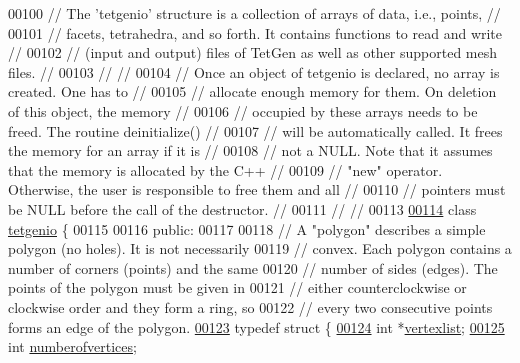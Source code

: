 \begin{DoxyCode}
00100 \textcolor{comment}{// The 'tetgenio' structure is a collection of arrays of data, i.e., points, //}
00101 \textcolor{comment}{// facets, tetrahedra, and so forth. It contains functions to read and write //}
00102 \textcolor{comment}{// (input and output) files of TetGen as well as other supported mesh files. //}
00103 \textcolor{comment}{//                                                                           //}
00104 \textcolor{comment}{// Once an object of tetgenio is declared,  no array is created. One has to  //}
00105 \textcolor{comment}{// allocate enough memory for them. On deletion of this object, the memory   //}
00106 \textcolor{comment}{// occupied by these arrays needs to be freed.  The routine deinitialize()   //}
00107 \textcolor{comment}{// will be automatically called.  It frees the memory for an array if it is  //}
00108 \textcolor{comment}{// not a NULL. Note that it assumes that the memory is allocated by the C++  //}
00109 \textcolor{comment}{// "new" operator.  Otherwise, the user is responsible to free them and all  //}
00110 \textcolor{comment}{// pointers must be NULL before the call of the destructor.                  //}
00111 \textcolor{comment}{//                                                                           //}
00113 \textcolor{comment}{}
\hypertarget{tetgen_8h_source.tex_l00114}{}\hyperlink{classtetgenio}{00114} \textcolor{keyword}{class }\hyperlink{classtetgenio}{tetgenio} \{
00115 
00116 \textcolor{keyword}{public}:
00117 
00118   \textcolor{comment}{// A "polygon" describes a simple polygon (no holes). It is not necessarily}
00119   \textcolor{comment}{//   convex. Each polygon contains a number of corners (points) and the same}
00120   \textcolor{comment}{//   number of sides (edges).  The points of the polygon must be given in}
00121   \textcolor{comment}{//   either counterclockwise or clockwise order and they form a ring, so }
00122   \textcolor{comment}{//   every two consecutive points forms an edge of the polygon.}
\hypertarget{tetgen_8h_source.tex_l00123}{}\hyperlink{structtetgenio_1_1polygon}{00123}   \textcolor{keyword}{typedef} \textcolor{keyword}{struct }\{
\hypertarget{tetgen_8h_source.tex_l00124}{}\hyperlink{structtetgenio_1_1polygon_a3cc2d3756bc093db5c252dd8f42a5001}{00124}     \textcolor{keywordtype}{int} *\hyperlink{structtetgenio_1_1polygon_a3cc2d3756bc093db5c252dd8f42a5001}{vertexlist};
\hypertarget{tetgen_8h_source.tex_l00125}{}\hyperlink{structtetgenio_1_1polygon_a019f9c62f145cf7d85227f401fcdba38}{00125}     \textcolor{keywordtype}{int} \hyperlink{structtetgenio_1_1polygon_a019f9c62f145cf7d85227f401fcdba38}{numberofvertices};

\end{DoxyCode}
